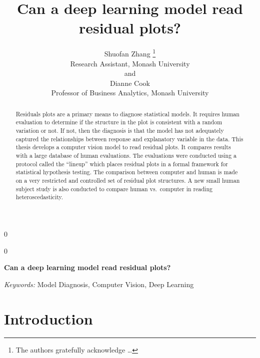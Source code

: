\documentclass[12pt]{article}
\newcommand{\blind}{0}
\begin{document}
\def\spacingset#1{\renewcommand{\baselinestretch}%
{#1}\small\normalsize} \spacingset{1}



\blind
{
  \title{\bf Can a deep learning model read residual plots?}

  \author{
        Shuofan Zhang \thanks{The authors gratefully acknowledge \ldots{}} \\
    Research Assistant, Monash University\\
     and \\     Dianne Cook \\
    Professor of Business Analytics, Monash University\\
      }
  \maketitle
} \fi

\blind
{
  \bigskip
  \bigskip
  \bigskip
  \begin{center}
    {\LARGE\bf Can a deep learning model read residual plots?}
  \end{center}
  \medskip
} \fi

\bigskip
\begin{abstract}
Residuals plots are a primary means to diagnose statistical models. It
requires human evaluation to determine if the structure in the plot is
consistent with a random variation or not. If not, then the diagnosis is
that the model has not adequately captured the relationships between
response and explanatory variable in the data. This thesis develops a
computer vision model to read residual plots. It compares results with a
large database of human evaluations. The evaluations were conducted
using a protocol called the ``lineup'' which places residual plots in a
formal framework for statistical hypothesis testing. The comparison
between computer and human is made on a very restricted and controlled
set of residual plot structures. A new small human subject study is also
conducted to compare human vs.~computer in reading heteroscedasticity.
\end{abstract}

\noindent%
{\it Keywords:} Model Diagnosis, Computer Vision, Deep Learning
\vfill

\newpage
\spacingset{1.45} %

\section{Introduction}\label{introduction}
\end{document}
